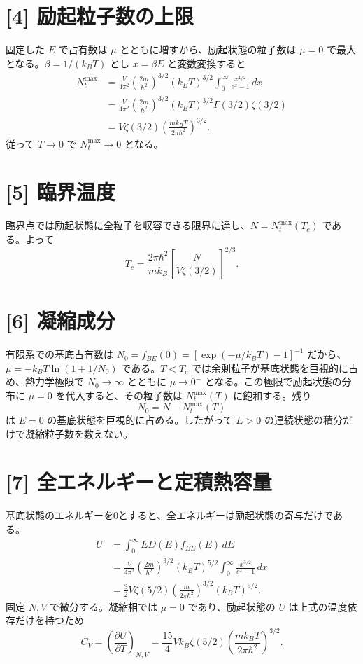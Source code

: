 \documentclass[11pt,a4paper]{article}
\begin{document}
\section*{[4] 励起粒子数の上限}
固定した $E$ で占有数は $\mu$ とともに増すから、励起状態の粒子数は $\mu=0$ で最大となる。$\beta=1/(k_BT)$ とし $x=\beta E$ と変数変換すると
\begin{align}
 N_t^{\max}
 &=\frac{V}{4\pi^2}\left(\frac{2m}{\hbar^2}\right)^{3/2}
   (k_BT)^{3/2}\int_0^\infty\frac{x^{1/2}}{e^x-1}\,dx\\
 &=\frac{V}{4\pi^2}\left(\frac{2m}{\hbar^2}\right)^{3/2}
   (k_BT)^{3/2}\Gamma(3/2)\zeta(3/2)\\
 &=\boxed{V\zeta(3/2)\left(\frac{mk_BT}{2\pi\hbar^2}\right)^{3/2}.}
\end{align}
従って $T\to0$ で $N_t^{\max}\to0$ となる。

\section*{[5] 臨界温度}
臨界点では励起状態に全粒子を収容できる限界に達し、$N=N_t^{\max}(T_c)$ である。よって
\begin{equation}
  \boxed{T_c=\frac{2\pi\hbar^2}{mk_B}
  \left[\frac{N}{V\zeta(3/2)}\right]^{2/3}.}
\end{equation}

\section*{[6] 凝縮成分}
有限系での基底占有数は $N_0=f_{BE}(0)=[\exp(-\mu/k_BT)-1]^{-1}$ だから、$\mu=-k_BT\ln(1+1/N_0)$ である。$T<T_c$ では余剰粒子が基底状態を巨視的に占め、熱力学極限で $N_0\to\infty$ とともに $\mu\to0^-$ となる。この極限で励起状態の分布に $\mu=0$ を代入すると、その粒子数は $N_t^{\max}(T)$ に飽和する。残り
\begin{equation}
  N_0=N-N_t^{\max}(T)
\end{equation}
は $E=0$ の基底状態を巨視的に占める。したがって $E>0$ の連続状態の積分だけで凝縮粒子数を数えない。

\section*{[7] 全エネルギーと定積熱容量}
基底状態のエネルギーを0とすると、全エネルギーは励起状態の寄与だけである。
\begin{align}
 U&=\int_0^\infty E D(E)f_{BE}(E)\,dE\\
 &=\frac{V}{4\pi^2}\left(\frac{2m}{\hbar^2}\right)^{3/2}
   (k_BT)^{5/2}\int_0^\infty\frac{x^{3/2}}{e^x-1}\,dx\\
 &=\boxed{\frac32V\zeta(5/2)
   \left(\frac{m}{2\pi\hbar^2}\right)^{3/2}(k_BT)^{5/2}.}
\end{align}
固定 $N,V$ で微分する。凝縮相では $\mu=0$ であり、励起状態の $U$ は上式の温度依存だけを持つため
\begin{equation}
  \boxed{C_V=\left(\frac{\partial U}{\partial T}\right)_{N,V}
   =\frac{15}{4}Vk_B\zeta(5/2)
     \left(\frac{mk_BT}{2\pi\hbar^2}\right)^{3/2}.}
\end{equation}
\end{document}
